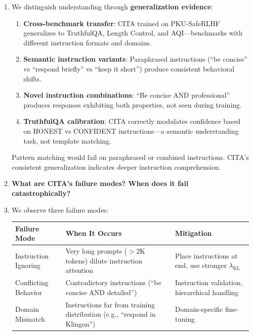 \begin{enumerate}[label=\textbf{Q\arabic*.}, leftmargin=*, itemsep=8pt]
\item[\ding{224}] We distinguish understanding through \textbf{generalization evidence}:

\begin{enumerate}[leftmargin=*,itemsep=2pt]
    \item \textbf{Cross-benchmark transfer}: CITA trained on PKU-SafeRLHF generalizes to TruthfulQA, Length Control, and AQI---benchmarks with different instruction formats and domains.

    \item \textbf{Semantic instruction variants}: Paraphrased instructions (``be concise'' vs ``respond briefly'' vs ``keep it short'') produce consistent behavioral shifts.

    \item \textbf{Novel instruction combinations}: ``Be concise AND professional'' produces responses exhibiting both properties, not seen during training.

    \item \textbf{TruthfulQA calibration}: CITA correctly modulates confidence based on HONEST vs CONFIDENT instructions---a semantic understanding task, not template matching.
\end{enumerate}

Pattern matching would fail on paraphrased or combined instructions. CITA's consistent generalization indicates deeper instruction comprehension.

\vspace{4mm}

\item[\ding{93}] \textbf{What are CITA's failure modes? When does it fail catastrophically?}

\item[\ding{224}] We observe three failure modes:

\begin{table}[H]
\centering
\small
\begin{tabular}{@{}lp{5cm}p{5cm}@{}}
\toprule
\textbf{Failure Mode} & \textbf{When It Occurs} & \textbf{Mitigation} \\
\midrule
Instruction Ignoring & Very long prompts ($>$2K tokens) dilute instruction attention & Place instructions at end, use stronger $\lambda_{\text{KL}}$ \\
\hline
Conflicting Behavior & Contradictory instructions (``be concise AND detailed'') & Instruction validation, hierarchical handling \\
\hline
Domain Mismatch & Instructions far from training distribution (e.g., ``respond in Klingon'') & Domain-specific fine-tuning \\
\bottomrule
\end{tabular}
\end{table}


\end{enumerate}
